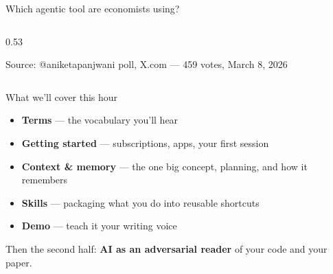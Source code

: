 \documentclass[aspectratio=169, 10pt]{beamer}
\begin{document}
\begin{frame}{Which agentic tool are economists using?}
\begin{columns}[c]
\begin{column}{0.53\textwidth}
{%
}
\vskip3pt
{\tiny\color{CoolGray} Source: @aniketapanjwani poll, X.com --- 459 votes, March 8, 2026}
\end{column}
\end{columns}
\end{frame}


\begin{frame}{What we'll cover this hour}
\vskip10pt
\begin{itemize}\setlength{\itemsep}{11pt}
  \item[\color{SlateTeal}\textbf{1.}] \textbf{Terms} --- the vocabulary you'll hear
  \item[\color{SlateTeal}\textbf{2.}] \textbf{Getting started} --- subscriptions, apps, your first session
  \item[\color{SlateTeal}\textbf{3.}] \textbf{Context \& memory} --- the one big concept, planning, and how it remembers
  \item[\color{SlateTeal}\textbf{4.}] \textbf{Skills} --- packaging what you do into reusable shortcuts
  \item[\color{SlateTeal}\textbf{5.}] \textbf{Demo} --- teach it your writing voice
\end{itemize}
\vskip10pt
\begin{tcolorbox}[accentbox, halign=center, top=3pt, bottom=3pt]
\small Then the second half: \textbf{AI as an adversarial reader} of your code and your paper.
\end{tcolorbox}
\end{frame}
\end{document}
